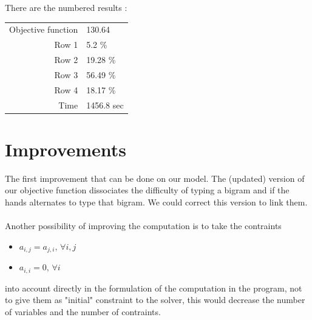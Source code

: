 \documentclass[a4paper,titlepage]{article}
\begin{document}
There are the numbered results : 
\begin{center}
	\begin{tabular}{r|l}
		Objective function & 130.64\\
		Row 1 & 5.2 \%\\
		Row 2 & 19.28 \%\\
		Row 3 & 56.49 \%\\
		Row 4 & 18.17 \%\\
		Time & 1456.8 sec
	\end{tabular}
\end{center}


\section{Improvements}

The first improvement that can be done on our model. The (updated) version of our objective function dissociates the difficulty of typing a bigram and if the hands alternates to type that bigram. We could correct this version to link them.

\paragraph{}

Another possibility of improving the computation is to take the contraints 
\begin{itemize}
	\item $a_{i,j} = a_{j,i} \text{, } \forall i,j$

	\item $a_{i,i} = 0 \text{, } \forall i$
\end{itemize}
into account directly in the formulation of the computation in the program, not to give them as "initial" constraint to the solver, this would decrease the number of variables and the number of contraints.


\newpage
\end{document}
